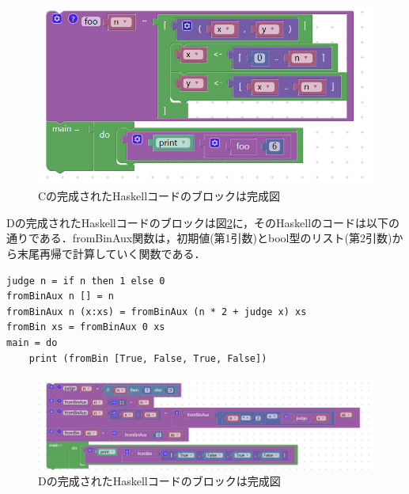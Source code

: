 \documentclass{risepaper}
\begin{document}
\begin{itemize}
\begin{figure}[h]
\begin{center}
\includegraphics[scale=0.5]{img/haskell_experiment_result_c.PNG}
\caption{Cの完成されたHaskellコードのブロックは完成図}%
\label{fig:haskell_experiment_result_c}
\end{center}%
\end{figure}%

Dの完成されたHaskellコードのブロックは図\ref{fig:haskell_experiment_result_d}に，そのHaskellのコードは以下の通りである．fromBinAux関数は，初期値(第1引数)とbool型のリスト(第2引数)から末尾再帰で計算していく関数である．

\begin{lstlisting}[basicstyle=\ttfamily\footnotesize]
judge n = if n then 1 else 0
fromBinAux n [] = n
fromBinAux n (x:xs) = fromBinAux (n * 2 + judge x) xs
fromBin xs = fromBinAux 0 xs
main = do
    print (fromBin [True, False, True, False])
\end{lstlisting}

\begin{figure}[h]
\begin{center}
\includegraphics[scale=0.5]{img/haskell_experiment_result_d.PNG}
\caption{Dの完成されたHaskellコードのブロックは完成図}%
\label{fig:haskell_experiment_result_d}
\end{center}%
\end{figure}%

\end{itemize} 
\end{document}
